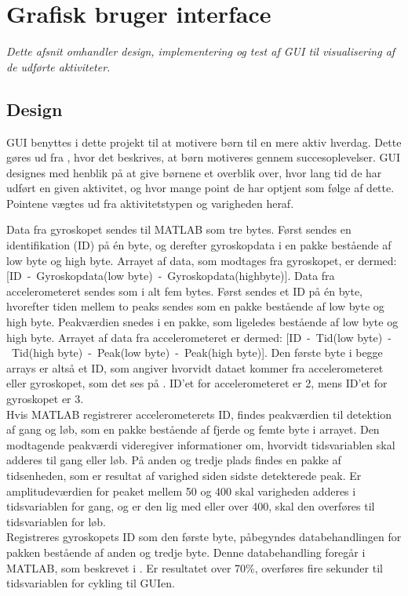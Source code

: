 \section{Grafisk bruger interface}\label{GUI_design}
\textit{Dette afsnit omhandler design, implementering og test af GUI til visualisering af de udførte aktiviteter.}

\subsection{Design}
GUI benyttes i dette projekt til at motivere børn til en mere aktiv hverdag. Dette gøres ud fra , hvor det beskrives, at børn motiveres gennem succesoplevelser. GUI designes med henblik på at give børnene et overblik over, hvor lang tid de har udført en given aktivitet, og hvor mange point de har optjent som følge af dette. Pointene vægtes ud fra aktivitetstypen og varigheden heraf.

Data fra gyroskopet sendes til MATLAB som tre bytes. Først sendes en identifikation (ID) på én byte, og derefter gyroskopdata i en pakke bestående af low byte og high byte. Arrayet af data, som modtages fra gyroskopet, er dermed: [ID~-~Gyroskopdata(low byte)~-~Gyroskopdata(highbyte)]. Data fra accelerometeret sendes som i alt fem bytes. Først sendes et ID på én byte, hvorefter tiden mellem to peaks sendes som en pakke bestående af low byte og high byte. Peakværdien snedes i en pakke, som ligeledes bestående af low byte og high byte. Arrayet af data fra accelerometeret er dermed: [ID~-~Tid(low byte)~-~Tid(high byte)~-~Peak(low byte)~-~Peak(high byte)]. Den første byte i begge arrays er altså et ID, som angiver hvorvidt dataet kommer fra accelerometeret eller gyroskopet, som det ses på . ID'et for accelerometeret er 2, mens ID'et for gyroskopet er 3.\\
Hvis MATLAB registrerer accelerometerets ID, findes peakværdien til detektion af gang og løb, som en pakke bestående af fjerde og femte byte i arrayet. Den modtagende peakværdi videregiver informationer om, hvorvidt tidsvariablen skal adderes til gang eller løb. På anden og tredje plads findes en pakke af tidsenheden, som er resultat af varighed siden sidste detekterede peak. Er amplitudeværdien for peaket mellem 50 og 400 skal varigheden adderes i tidsvariablen for gang, og er den lig med eller over 400, skal den overføres til tidsvariablen for løb.\\
Registreres gyroskopets ID som den første byte, påbegyndes databehandlingen for pakken bestående af anden og tredje byte. Denne databehandling foregår i MATLAB, som beskrevet i . Er resultatet over 70\%, overføres fire sekunder til tidsvariablen for cykling til GUIen.

